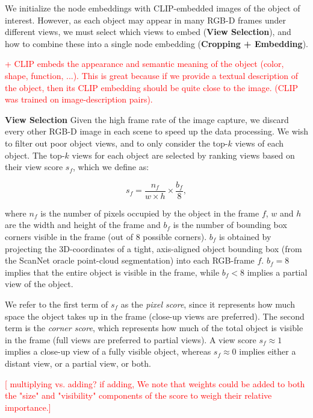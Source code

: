 We initialize the node embeddings with CLIP-embedded images of the object of interest. However, as each object may appear in many RGB-D frames under different views, we must select which views to embed (\textbf{View Selection}), and how to combine these into a single node embedding (\textbf{Cropping + Embedding}).

\textcolor{red}{+ CLIP embeds the appearance and semantic meaning of the object (color, shape, function, ...). This is great because if we provide a textual description of the object, then its CLIP embedding should be quite close to the image. (CLIP was trained on image-description pairs).}

\bigskip
\noindent
\textbf{View Selection}
Given the high frame rate of the image capture, we discard every other RGB-D image in each scene to speed up the data processing. We wish to filter out poor object views, and to only consider the top-$k$ views of each object. The top-$k$ views for each object are selected by ranking views based on their view score $s_f$, which we define as:

\begin{equation*}
    s_f = \frac{n_f}{w \times h} \times \frac{b_f}{8},
\end{equation*}

\noindent
where $n_f$ is the number of pixels occupied by the object in the frame $f$, $w$ and $h$ are the width and height of the frame and $b_f$ is the number of bounding box corners visible in the frame (out of 8 possible corners). $b_f$ is obtained by projecting the 3D-coordinates of a tight, axis-aligned object bounding box (from the ScanNet oracle point-cloud segmentation) into each RGB-frame $f$. $b_f = 8$ implies that the entire object is visible in the frame, while $b_f < 8$ implies a partial view of the object.

We refer to the first term of $s_f$ as the \textit{pixel score}, since it represents how much space the object takes up in the frame (close-up views are preferred). The second term is the \textit{corner score}, which represents how much of the total object is visible in the frame (full views are preferred to partial views). A view score $s_f \approx 1$ implies a close-up view of a fully visible object, whereas $s_f \approx 0$ implies either a distant view, or a partial view, or both.

\bigskip
\textcolor{red}{[ multiplying vs. adding? if adding, We note that weights could be added to both the "size" and "visibility" components of the score to weigh their relative importance.]}

